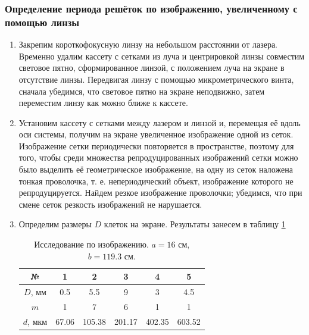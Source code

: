 \documentclass[a4paper, 12pt]{article}
\begin{document}
	\subsubsection{Определение периода решёток по изображению, увеличенному с помощью линзы}
	\begin{enumerate}
		\item Закрепим короткофокусную линзу на небольшом расстоянии от лазера. Временно удалим кассету с сетками из луча и центрировкой линзы совместим световое пятно, сформированное линзой, с положением луча на экране в отсутствие линзы. Передвигая линзу с помощью микрометрического винта, сначала убедимся, что световое пятно на экране неподвижно, затем переместим линзу как можно ближе к кассете.
		\item Установим кассету с сетками между лазером и линзой и, перемещая её вдоль оси системы, получим на экране увеличенное изображение одной из сеток.\\
			Изображение сетки периодически повторяется в пространстве, поэтому для того, чтобы среди множества репродуцированных изображений сетки можно было выделить её геометрическое изображение, на одну из сеток наложена тонкая проволочка, т. е. непериодический объект, изображение которого не репродуцируется. Найдем резкое изображение проволочки; убедимся, что при смене сеток резкость изображений не нарушается.
			\item Определим размеры $D$ клеток на экране. Результаты занесем в таблицу \ref{tab:2}
			\begin{table}[h]
				\centering
				\begin{tabular}{|c|c|c|c|c|c|}
					\hline
					№ & 1 & 2 & 3 & 4 & 5\\
					\hline
					$D$, мм & 0.5 & 5.5 & 9 & 3 & 4.5\\
					$m$ & 1 & 7 & 6 & 1 & 1\\
					$d$, мкм & 67.06 & 105.38 & 201.17 & 402.35 & 603.52\\
					\hline
				\end{tabular}
				\caption{Исследование по изображению. $a=16$ см, $b=119.3$ см.}
				\label{tab:2}
			\end{table}
	\end{enumerate}
\end{document}
